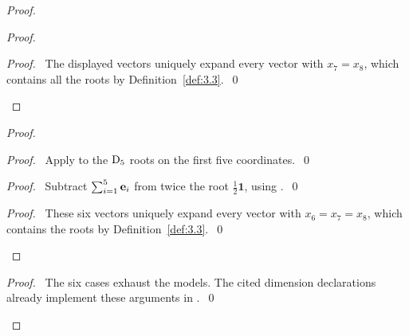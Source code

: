 \begin{proof}
\begin{proof}
  \qedstep
  \begin{proof}\pf\ The displayed vectors uniquely expand every vector with
   $x_7=x_8$, which contains all the roots by Definition~\ref{def:3.3}.~\qed\end{proof}
 \end{proof}
 \begin{proof}
  \begin{proof}\pf\ Apply  to the $\mathrm{D}_5$ roots on the first five coordinates.~\qed\end{proof}
  \begin{proof}\pf\ Subtract $\sum_{i=1}^5{\mathbf e}_i$ from twice the root
   $\frac12\mathbf1$, using .~\qed\end{proof}
  \qedstep
  \begin{proof}\pf\ These six vectors uniquely expand every vector with
   $x_6=x_7=x_8$, which contains the roots by Definition~\ref{def:3.3}.~\qed\end{proof}
 \end{proof}
 \qedstep
 \begin{proof}\pf\ The six cases exhaust the models. The cited dimension declarations
  already implement these arguments in .~\qed\end{proof}
\end{proof}

